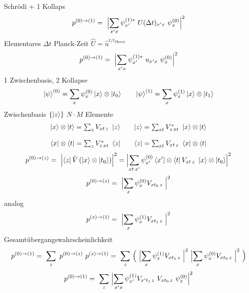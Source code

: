 \documentclass[12pt]{article}
\begin{document}
Schrödi + 1 Kollaps
\begin{equation} 
p^{(0)\rightarrow(1)} =\ \Bigl| \sum_{x'x} \psi^{(1)*}_{x'}\ U(\Delta t)_{x'x}\ \psi^{(0)}_x \Bigr|^2
\end{equation}
Elementares $\Delta t$ Planck-Zeit $\hat{U} = \hat{u}^{t/t_{Planck}}$
\begin{equation} 
p^{(0)\rightarrow(1)} =\ \Bigl| \sum_{x'x} \psi^{(1)*}_{x'}\ u_{x'x}\ \psi^{(0)}_x \Bigr|^2
\end{equation}
1 Zwischenbasis, 2 Kollapse
\begin{equation} 
\ket{\psi}^{(0)} =  \sum_{x} \psi^{(0)}_x \ket{x} \otimes \ket{t_0} \quad\quad
\ket{\psi}^{(1)} =  \sum_{x} \psi^{(1)}_x \ket{x} \otimes \ket{t_1}
\end{equation}
Zwischenbasis $\{\ket{z}\}$ $N \cdot M$ Elemente
\begin{equation} 
\begin{matrix}
\ket{x} \otimes \ket{t} = \sum_z V_{xt\, z}\ \ket{z} && 
\ket{z} = \sum_{xt} V^*_{z\, xt}\ \ket{x} \otimes \ket{t} 
\\ \\
\bra{x} \otimes \bra{t} = \sum_z V^*_{z\, xt}\ \bra{z} &&
\bra{z} = \sum_{xt} V_{xt\, z}\ \bra{x} \otimes \bra{t} 
\end{matrix}
\end{equation}
\begin{equation} 
p^{(0)\rightarrow(z)} =\ \Bigl| \bra{z} \hat{V} \left(\ket{x}\otimes\ket{t_0}\right)\Bigr|^2
= \Bigl|\sum_{xt\, x'} \psi^{(0)}_{x'} \bra{x'} \otimes \bra{t} V_{xt\, z}\ \ket{x} \otimes \ket{t_0}\Bigr|^2 
\end{equation}
\begin{equation} 
p^{(0)\rightarrow(z)} =\ \Bigl|\sum_{x} \psi^{(0)}_{x} V_{xt_0\, z}\ \Bigr|^2 
\end{equation}
analog
\begin{equation} 
p^{(z)\rightarrow(1)} =\ \Bigl|\sum_{x} \psi^{(1)}_{x} V_{xt_1\, z}\ \Bigr|^2 
\end{equation}
Gesamtübergangswahrscheinlichkeit
\begin{equation} 
p^{(0)\rightarrow(1)} =\ \sum_z\ p^{(0)\rightarrow(z)}\ p^{(z)\rightarrow(1)}
= \ \sum_{z}\ \Bigl(\ \Bigl|\sum_{x} \psi^{(1)}_{x} V_{xt_1\, z}\ \Bigr|^2\ \Bigl|\sum_{x} \psi^{(0)}_{x} V_{xt_0\, z}\ \Bigr|^2\ \Bigr)
\end{equation}
\begin{equation} 
p^{(0)\rightarrow(1)} 
= \ \sum_{z}\ \Bigl|\sum_{x'x} \psi^{(1)}_{x'} V_{x't_1\, z}\ V_{xt_0\, z}\ \psi^{(0)}_{x} \Bigr|^2  
\end{equation}
\end{document}

